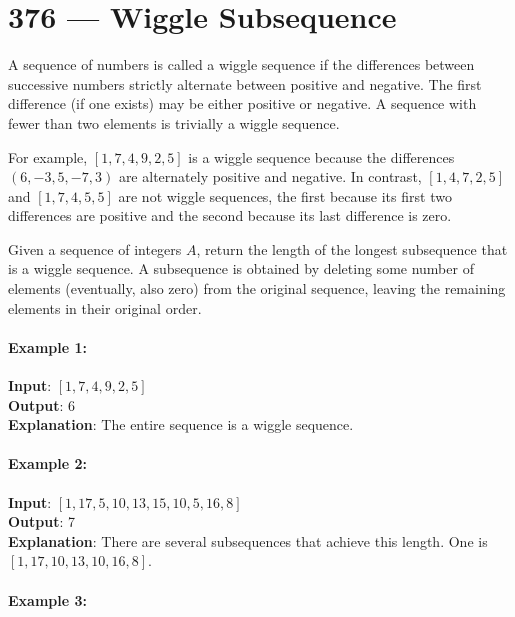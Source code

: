 \section{376 --- Wiggle Subsequence}
A sequence of numbers is called a wiggle sequence if the differences between successive numbers strictly alternate between positive and negative. The first difference (if one exists) may be either positive or negative. A sequence with fewer than two elements is trivially a wiggle sequence.
\par
For example, $ [1,7,4,9,2,5] $ is a wiggle sequence because the differences $ (6,-3,5,-7,3) $ are alternately positive and negative. In contrast, $ [1,4,7,2,5] $ and $ [1,7,4,5,5] $ are not wiggle sequences, the first because its first two differences are positive and the second because its last difference is zero.
\par
Given a sequence of integers $A$, return the length of the longest subsequence that is a wiggle sequence. A subsequence is obtained by deleting some number of elements (eventually, also zero) from the original sequence, leaving the remaining elements in their original order.

\paragraph{Example 1:}

\begin{flushleft}
\textbf{Input}: $ [1,7,4,9,2,5] $
\\
\textbf{Output}: 6
\\
\textbf{Explanation}: The entire sequence is a wiggle sequence.
\end{flushleft}

\paragraph{Example 2:}

\begin{flushleft}
\textbf{Input}: $ [1,17,5,10,13,15,10,5,16,8] $
\\
\textbf{Output}: 7
\\
\textbf{Explanation}: There are several subsequences that achieve this length. One is $ [1,17,10,13,10,16,8] $.
\end{flushleft}

\paragraph{Example 3:}

